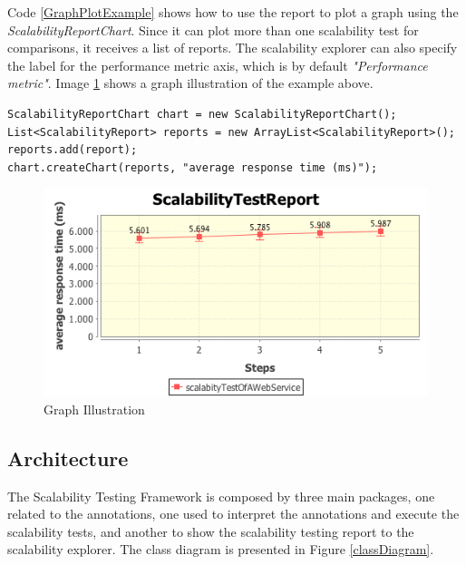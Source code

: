 Code \ref{GraphPlotExample} shows how to use the report to plot a graph using the \emph{ScalabilityReportChart}. Since it can plot more than one scalability test for comparisons, it receives a list of reports. The scalability explorer can also specify the label for the performance metric axis, which is by default \emph{"Performance metric"}. Image \ref{graphIllustration} shows a graph illustration of the example above.

\begin{lstlisting}
ScalabilityReportChart chart = new ScalabilityReportChart();
List<ScalabilityReport> reports = new ArrayList<ScalabilityReport>();
reports.add(report);
chart.createChart(reports, "average response time (ms)");
\end{lstlisting}

\begin{figure}[h]
\begin{center}
	\includegraphics[scale=0.7]{images/graphExample}
\caption{Graph Illustration}
\label{graphIllustration}
\end{center}
\end{figure}

\subsection{Architecture}
The Scalability Testing Framework is composed by three main packages, one related to the annotations, one used to interpret the annotations and execute the scalability tests, and another to show the scalability testing report to the scalability explorer. The class diagram is presented in Figure \ref{classDiagram}.

